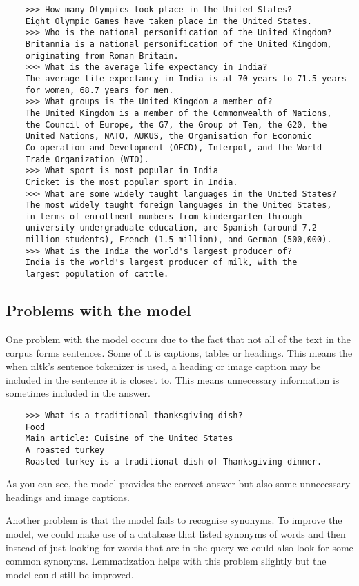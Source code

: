 \documentclass{article}
\begin{document}
\begin{verbatim}
    >>> How many Olympics took place in the United States?
    Eight Olympic Games have taken place in the United States.
    >>> Who is the national personification of the United Kingdom?
    Britannia is a national personification of the United Kingdom, 
    originating from Roman Britain.
    >>> What is the average life expectancy in India?
    The average life expectancy in India is at 70 years to 71.5 years 
    for women, 68.7 years for men.
    >>> What groups is the United Kingdom a member of?
    The United Kingdom is a member of the Commonwealth of Nations, 
    the Council of Europe, the G7, the Group of Ten, the G20, the
    United Nations, NATO, AUKUS, the Organisation for Economic 
    Co-operation and Development (OECD), Interpol, and the World 
    Trade Organization (WTO).
    >>> What sport is most popular in India
    Cricket is the most popular sport in India.
    >>> What are some widely taught languages in the United States?
    The most widely taught foreign languages in the United States, 
    in terms of enrollment numbers from kindergarten through 
    university undergraduate education, are Spanish (around 7.2 
    million students), French (1.5 million), and German (500,000).
    >>> What is the India the world's largest producer of?
    India is the world's largest producer of milk, with the 
    largest population of cattle.
\end{verbatim}

\subsection{Problems with the model}
One problem with the model occurs due to the fact that not all of the text in the corpus forms sentences. Some of it is captions, tables or headings. This means the when nltk's sentence tokenizer is used, a heading or image caption may be included in the sentence it is closest to. This means unnecessary information is sometimes included in the answer.

\begin{verbatim}
    >>> What is a traditional thanksgiving dish?
    Food
    Main article: Cuisine of the United States
    A roasted turkey
    Roasted turkey is a traditional dish of Thanksgiving dinner.
\end{verbatim}

As you can see, the model provides the correct answer but also some unnecessary headings and image captions.

Another problem is that the model fails to recognise synonyms. To improve the model, we could make use of a database that listed synonyms of words and then instead of just looking for words that are in the query we could also look for some common synonyms. Lemmatization helps with this problem slightly but the model could still be improved.
\end{document}
